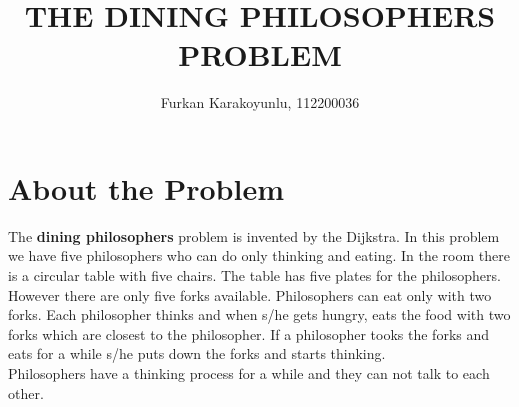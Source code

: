 \documentclass[12pt]{article}
\begin{document}
 \title{THE DINING PHILOSOPHERS PROBLEM}
 \author{Furkan Karakoyunlu, 112200036}
 \maketitle
 
 \section*{About the Problem}
 \begin{flushleft}
  The \textbf{dining philosophers} problem is invented by the Dijkstra. In this problem we have five philosophers who can do only
  thinking and eating. In the room there is a circular table with five chairs. The table has five plates for the philosophers. 
  However there are only five forks available. Philosophers can eat only with two forks. Each philosopher thinks and when s/he 
  gets hungry, eats the food with two forks which are closest to the philosopher. If a philosopher tooks the forks and eats 
  for a while s/he puts down the forks and starts thinking.\\
  \bigskip
  Philosophers have a thinking process for a while and they can not talk to each other.
 \end{flushleft}
 
\end{document}
